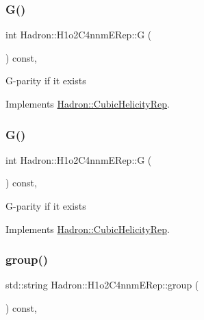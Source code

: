 \subsubsection{\texorpdfstring{G()}{G()}\hspace{0.1cm}{\footnotesize\ttfamily [2/3]}}
{\footnotesize\ttfamily int Hadron\+::\+H1o2\+C4nnm\+E\+Rep\+::G (\begin{DoxyParamCaption}{ }\end{DoxyParamCaption}) const\hspace{0.3cm}{\ttfamily [inline]}, {\ttfamily [virtual]}}

G-\/parity if it exists 

Implements \mbox{\hyperlink{structHadron_1_1CubicHelicityRep_a50689f42be1e6170aa8cf6ad0597018b}{Hadron\+::\+Cubic\+Helicity\+Rep}}.

\mbox{\label{structHadron_1_1H1o2C4nnmERep_a5ff5cb2d786f5befca7638a9dcaf3f14}} 
\subsubsection{\texorpdfstring{G()}{G()}\hspace{0.1cm}{\footnotesize\ttfamily [3/3]}}
{\footnotesize\ttfamily int Hadron\+::\+H1o2\+C4nnm\+E\+Rep\+::G (\begin{DoxyParamCaption}{ }\end{DoxyParamCaption}) const\hspace{0.3cm}{\ttfamily [inline]}, {\ttfamily [virtual]}}

G-\/parity if it exists 

Implements \mbox{\hyperlink{structHadron_1_1CubicHelicityRep_a50689f42be1e6170aa8cf6ad0597018b}{Hadron\+::\+Cubic\+Helicity\+Rep}}.

\mbox{\label{structHadron_1_1H1o2C4nnmERep_a23b4794a3121b2c1d2fdbb09b4191816}} 
\subsubsection{\texorpdfstring{group()}{group()}\hspace{0.1cm}{\footnotesize\ttfamily [1/3]}}
{\footnotesize\ttfamily std\+::string Hadron\+::\+H1o2\+C4nnm\+E\+Rep\+::group (\begin{DoxyParamCaption}{ }\end{DoxyParamCaption}) const\hspace{0.3cm}{\ttfamily [inline]}, {\ttfamily [virtual]}}

